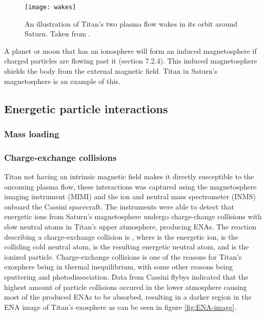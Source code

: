 \documentclass[12pt, parskip=full*, abstract]{scrartcl}
\begin{document}
\begin{figure}[htbp]
	\centering
	\texttt{[image: wakes]}
	\caption{An illustration of Titan's two plasma flow wakes in its orbit around Saturn. Taken from \textcite{ionosphere-magnetosphere-interaction-coates}.}
	\label{wakes}
\end{figure}

A planet or moon that has an ionosphere will form an induced magnetosphere if charged particles are flowing past it (section 7.2.4). This induced magnetosphere shields the body from the external magnetic field. Titan in Saturn's magnetosphere is an example of this.




\subsection{Energetic particle interactions}

\subsubsection{Mass loading}

\subsubsection{Charge-exchange collisions}
\parencite{titan-exosphere-interaction}
Titan not having an intrinsic magnetic field makes it directly susceptible to the oncoming plasma flow, these interactions was captured using the magnetosphere imaging instrument (MIMI) and the ion and neutral mass spectrometer (INMS) onboard the Cassini spacecraft. The instruments were able to detect that energetic ions from Saturn's magnetosphere undergo charge-change collisions with slow neutral atoms in Titan's upper atmosphere, producing ENAs. The reaction describing a charge-exchange collision is , where  is the energetic ion,  is the colliding cold neutral atom,  is the resulting energetic neutral atom, and  is the ionized particle. Charge-exchange collisions is one of the reasons for Titan's exosphere being in thermal inequilibrium, with some other reasons being sputtering and photodissociation. Data from Cassini flybys indicated that the highest amount of particle collisions occured in the lower atmosphere causing most of the produced ENAs to be absorbed, resulting in a darker region in the ENA image of Titan's exosphere as can be seen in figure \ref{fig:ENA-image}.
\end{document}
